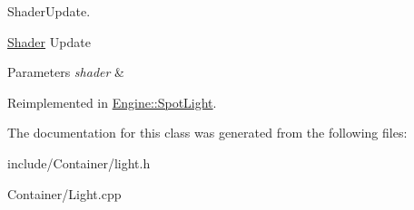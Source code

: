 Shader\+Update. 

\hyperlink{classEngine_1_1Shader}{Shader} Update 
\begin{DoxyParams}{Parameters}
{\em shader} & \\
\hline
\end{DoxyParams}


Reimplemented in \hyperlink{classEngine_1_1SpotLight_aa6f5b9024c2cab0fab556e4f66611fa4}{Engine\+::\+Spot\+Light}.



The documentation for this class was generated from the following files\+:\begin{DoxyCompactItemize}
\item 
include/\+Container/light.\+h\item 
Container/Light.\+cpp\end{DoxyCompactItemize}
